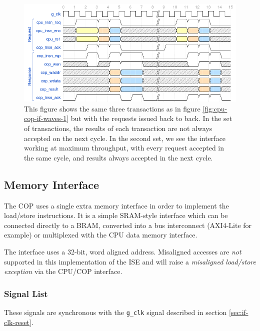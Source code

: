 \documentclass{scarv-report}
\begin{document}
\begin{figure}[H]
\centering
\includegraphics[width=\textwidth]{image/cpu-cop-if-2.png}
\caption{This figure shows the same three transactions as in figure
\ref{fig:cpu-cop-if-waves-1} but with the requests issued back to back.
In the set of transactions, the results of each transaction are not always
accepted on the next cycle. In the second set, we see the interface working
at maximum throughput, with every request accepted in the same cycle, and
results always accepted in the next cycle.}
\end{figure}



\subsection{Memory Interface}
\label{sec:mem-if}

The COP uses a single extra memory interface in order to implement the
load/store instructions. It is a simple SRAM-style interface which can be
connected directly to a BRAM, converted into a bus interconnect (AXI4-Lite
for example) or multiplexed with the CPU data memory interface.

The interface uses a 32-bit, word aligned address. Misaligned accesses
are {\em not} supported in this implementation of the ISE and will raise
a {\em misaligned load/store exception} via the CPU/COP interface.

\subsubsection{Signal List}

These signals are synchronous with the {\tt g\_clk} signal described in
section \ref{sec:if-clk-reset}.
\end{document}

